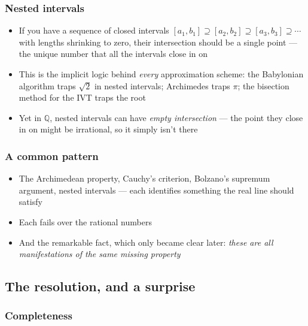 \documentclass[
  10pt,
  letterpaper,
]{scrbook}
\providecommand{\tightlist}{%
  \setlength{\itemsep}{0pt}\setlength{\parskip}{0pt}}
\newcommand{\QQ}{\mathbb{Q}}
\begin{document}
\subsubsection*{Nested intervals}\label{nested-intervals}

\begin{itemize}
\tightlist
\item
  If you have a sequence of closed intervals
  \([a_1, b_1] \supseteq [a_2, b_2] \supseteq [a_3, b_3] \supseteq \cdots\)
  with lengths shrinking to zero, their intersection should be a single
  point --- the unique number that all the intervals close in on
\item
  This is the implicit logic behind \emph{every} approximation scheme:
  the Babylonian algorithm traps \(\sqrt{2}\) in nested intervals;
  Archimedes traps \(\pi\); the bisection method for the IVT traps the
  root
\item
  Yet in \(\QQ\), nested intervals can have \emph{empty intersection}
  --- the point they close in on might be irrational, so it simply isn't
  there
\end{itemize}

\subsubsection*{A common pattern}\label{a-common-pattern}

\begin{itemize}
\tightlist
\item
  The Archimedean property, Cauchy's criterion, Bolzano's supremum
  argument, nested intervals --- each identifies something the real line
  should satisfy
\item
  Each fails over the rational numbers
\item
  And the remarkable fact, which only became clear later: \emph{these
  are all manifestations of the same missing property}
\end{itemize}

\subsection*{The resolution, and a
surprise}\label{the-resolution-and-a-surprise}

\subsubsection*{Completeness}\label{completeness}
\end{document}
